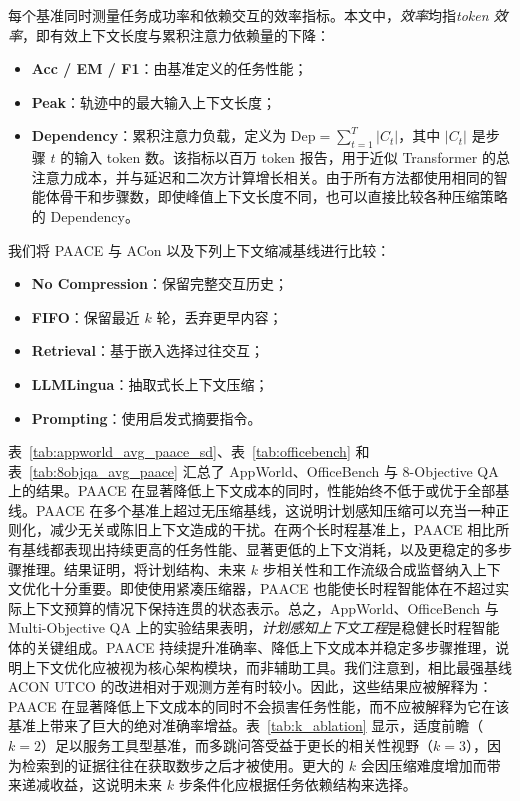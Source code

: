 \documentclass[10pt,twocolumn]{article}
\begin{document}
每个基准同时测量任务成功率和依赖交互的效率指标。本文中，\emph{效率}均指\emph{token 效率}，即有效上下文长度与累积注意力依赖量的下降：
\begin{itemize}
  \item \textbf{Acc / EM / F1}：由基准定义的任务性能；
  \item \textbf{Peak}：轨迹中的最大输入上下文长度；
  \item \textbf{Dependency}：累积注意力负载，定义为 $\mathrm{Dep}=\sum_{t=1}^{T}|C_t|$，其中 $|C_t|$ 是步骤 $t$ 的输入 token 数。该指标以百万 token 报告，用于近似 Transformer 的总注意力成本，并与延迟和二次方计算增长相关。由于所有方法都使用相同的智能体骨干和步骤数，即使峰值上下文长度不同，也可以直接比较各种压缩策略的 Dependency。
\end{itemize}

我们将 PAACE 与 ACon \citep{acon2025yu} 以及下列上下文缩减基线进行比较：
\begin{itemize}
  \item \textbf{No Compression}：保留完整交互历史；
  \item \textbf{FIFO}：保留最近 $k$ 轮，丢弃更早内容；
  \item \textbf{Retrieval}：基于嵌入选择过往交互；
  \item \textbf{LLMLingua}：抽取式长上下文压缩；
  \item \textbf{Prompting}：使用启发式摘要指令。
\end{itemize}

表~\ref{tab:appworld_avg_paace_sd}、表~\ref{tab:officebench} 和表~\ref{tab:8objqa_avg_paace} 汇总了 AppWorld、OfficeBench 与 8-Objective QA 上的结果。PAACE 在显著降低上下文成本的同时，性能始终不低于或优于全部基线。PAACE 在多个基准上超过无压缩基线，这说明计划感知压缩可以充当一种正则化，减少无关或陈旧上下文造成的干扰。在两个长时程基准上，PAACE 相比所有基线都表现出持续更高的任务性能、显著更低的上下文消耗，以及更稳定的多步骤推理。结果证明，将计划结构、未来 $k$ 步相关性和工作流级合成监督纳入上下文优化十分重要。即使使用紧凑压缩器，PAACE 也能使长时程智能体在不超过实际上下文预算的情况下保持连贯的状态表示。总之，AppWorld、OfficeBench 与 Multi-Objective QA 上的实验结果表明，\emph{计划感知上下文工程}是稳健长时程智能体的关键组成。PAACE 持续提升准确率、降低上下文成本并稳定多步骤推理，说明上下文优化应被视为核心架构模块，而非辅助工具。我们注意到，相比最强基线 ACON UTCO 的改进相对于观测方差有时较小。因此，这些结果应被解释为：PAACE 在显著降低上下文成本的同时不会损害任务性能，而不应被解释为它在该基准上带来了巨大的绝对准确率增益。表~\ref{tab:k_ablation} 显示，适度前瞻（$k=2$）足以服务工具型基准，而多跳问答受益于更长的相关性视野（$k=3$），因为检索到的证据往往在获取数步之后才被使用。更大的 $k$ 会因压缩难度增加而带来递减收益，这说明未来 $k$ 步条件化应根据任务依赖结构来选择。
\end{document}
